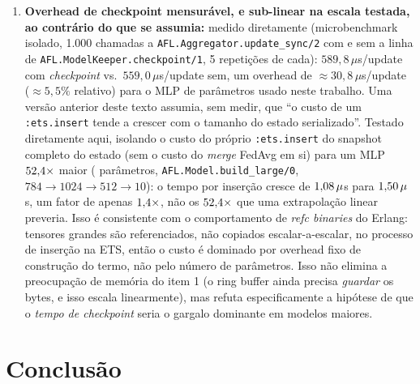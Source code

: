 \documentclass[conference,a4paper]{IEEEtran}
\begin{document}
\begin{enumerate}[noitemsep,leftmargin=*]
    versão do trabalho; permanecer com os herdeiros triviais (sem lógica
    além de guardar uma referência ETS) minimiza, mas não elimina, a
    probabilidade de o próprio herdeiro falhar.
  \item \textbf{Overhead de checkpoint mensurável, e sub-linear na escala
    testada, ao contrário do que se assumia:} medido diretamente
    (microbenchmark isolado, 1.000 chamadas a
    \texttt{AFL.Aggregator.update\_sync/2} com e sem a linha de
    \texttt{AFL.ModelKeeper.checkpoint/1}, 5 repetições de cada):
    $589{,}8\,\mu$s/update com \textit{checkpoint} vs.\ $559{,}0\,\mu$s/update
    sem, um overhead de $\approx30{,}8\,\mu$s/update ($\approx5{,}5\%$
    relativo) para o MLP de \statScaleSmallParams{} parâmetros usado neste
    trabalho. Uma versão anterior deste texto assumia, sem medir, que ``o
    custo de um \texttt{:ets.insert} tende a crescer com o tamanho do
    estado serializado''. Testado diretamente aqui, isolando o custo do
    próprio \texttt{:ets.insert} do snapshot completo do estado (sem o
    custo do \textit{merge} FedAvg em si) para um MLP
    $52{,}4\times$ maior (\statScaleLargeParams{} parâmetros,
    \texttt{AFL.Model.build\_large/0}, $784\!\to\!1024\!\to\!512\!\to\!10$):
    o tempo por inserção cresce de $1{,}08\,\mu$s para
    $1{,}50\,\mu$s, um fator de apenas
    $1{,}4\times$, não os $52{,}4\times$ que uma extrapolação
    linear preveria. Isso é consistente com o comportamento de
    \textit{refc binaries} do Erlang: tensores grandes são referenciados,
    não copiados escalar-a-escalar, no processo de inserção na ETS, então o
    custo é dominado por overhead fixo de construção do termo, não pelo
    número de parâmetros. Isso não elimina a preocupação de memória do
    item 1 (o ring buffer ainda precisa \emph{guardar} os bytes, e isso
    escala linearmente), mas refuta especificamente a hipótese de que o
    \emph{tempo de checkpoint} seria o gargalo dominante em modelos maiores.
\end{enumerate}

\section{Conclusão}
\label{sec:conclusion}
\end{document}

